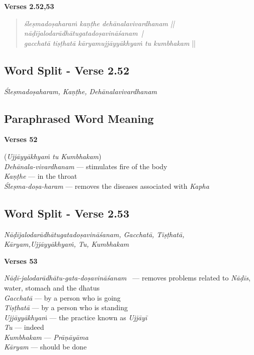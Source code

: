 
\noindent \textbf{Verses 2.52,53}

\begin{verse}
\textit{śleṣmadoṣaharaṁ kaṇṭhe dehānalavivardhanam ||\\
nāḍījalodarādhātugatadoṣavināśanam |\\
gacchatā tiṣṭhatā kāryamujjāyyākhyaṁ tu kumbhakam} ||
\end{verse}

\subsection*{Word Split - Verse 2.52}

\textit{Śleṣmadoṣaharam, Kaṇṭhe, Dehānalavivardhanam}

\subsection*{Paraphrased Word Meaning}

\noindent \textbf{Verses 52}

\begin{multicols}{2}
(\textit{Ujjāyyākhyaṁ tu Kumbhakam})\\
\textit{Dehānala-vivardhanam }--- stimulates fire of the body \\
\textit{Kaṇṭhe} --- in the throat  \\
\textit{Śleṣma-doṣa-haram }--- removes the diseases associated with \textit{Kapha} 
\end{multicols}

\subsection*{Word Split - Verse 2.53}

\textit{Nāḍījalodarādhātugatadoṣavināśanam, Gacchatā, Tiṣṭhatā, Kāryam,\break Ujjāyyākhyaṁ, Tu, Kumbhakam}

\noindent \textbf{Verses 53}

\begin{multicols}{2}
\textit{Nāḍī-jalodarādhātu-gata-doṣavi\-nāśanam  }--- removes problems related to \textit{Nāḍīs}, water, stomach and the dhatus\\
\textit{Gacchatā} --- by a person who is going \\
\textit{Tiṣṭhatā} --- by a person who is standing \\
\textit{Ujjāyyākhyaṁ} --- the practice known as \textit{Ujjāyī}\\
\textit{Tu} --- indeed \\
\textit{Kumbhakam} --- \textit{Prāṇāyāma} \\
\textit{Kāryam} --- should be done
\end{multicols}

